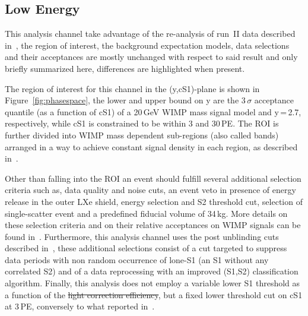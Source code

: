 
\subsection{Low Energy}
\label{subsec:LowE}
This analysis channel take advantage of the re-analysis of run~II data described in~\cite{xe100_run_combination}, the region of interest, the background 
expectation models, data selections and their acceptances are mostly unchanged with respect to said result and only briefly summarized here, 
differences are highlighted when present. 

The region of interest for this channel in the (y,cS1)-plane is shown in Figure~\ref{fig:phasespace},  the lower and upper bound on y are the 
3\,$\sigma$ acceptance quantile (as a function of cS1) of a 20\,GeV WIMP mass signal model and y\,=\,2.7, respectively, while cS1 is 
constrained to be within 3 and 30\,PE. The ROI is further divided into WIMP mass dependent sub-regions (also called bands) arranged in a way 
to achieve constant signal density in each region, as described in~\cite{xe100_run_combination}.

Other than falling into the ROI an event should fulfill several additional selection criteria such as, data quality and noise cuts,
an event veto in presence of energy release in the outer LXe shield, energy selection and S2 threshold cut, 
selection of single-scatter event and a predefined fiducial volume of 34\,kg. More details on these selection criteria and on their 
relative acceptances on WIMP signals can be found in~\cite{Aprile:2012vw,xe100_run_combination}. 
Furthermore, this analysis channel uses the post unblinding cuts described in~\cite{xe100_run_combination}, 
these additional selections consist of a cut targeted to suppress data periods with non random occurrence of lone-S1 (an S1 without 
any correlated S2) and of a data reprocessing with an improved (S1,S2) classification algorithm.
Finally, this analysis does not employ a variable lower S1 threshold as a function of the \sout{light correction efficiency}, but a fixed 
lower threshold cut on cS1 at 3\,PE, conversely to what reported in~\cite{xe100_run_combination}.

